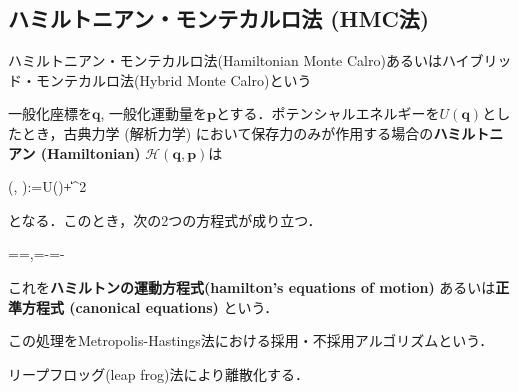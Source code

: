 \subsection{ハミルトニアン・モンテカルロ法 (HMC法)}
ハミルトニアン・モンテカルロ法(Hamiltonian Monte Calro)あるいはハイブリッド・モンテカルロ法(Hybrid Monte Calro)という

一般化座標を$\mathbf{q}$, 一般化運動量を$\mathbf{p}$とする．ポテンシャルエネルギーを$U(\mathbf{q})$としたとき，古典力学 (解析力学) において保存力のみが作用する場合の\textbf{ハミルトニアン (Hamiltonian)} $\mathcal{H}(\mathbf{q}, \mathbf{p})$は


(, ):=U()+\|\|^2


となる．このとき，次の2つの方程式が成り立つ．


==,\quad{}=-=-


これを\textbf{ハミルトンの運動方程式(hamilton's equations of motion)} あるいは\textbf{正準方程式 (canonical equations)} という．


この処理をMetropolis-Hastings法における採用・不採用アルゴリズムという．

リープフロッグ(leap frog)法により離散化する．
